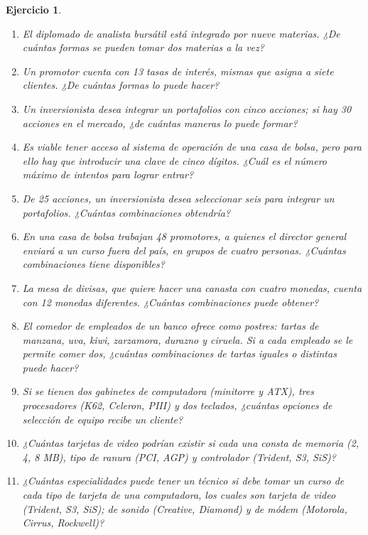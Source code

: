 \documentclass[12pt,twoside]{article}
\newtheorem{Ejer}{Ejercicio}
\begin{document}
\begin{Ejer}
\begin{enumerate}
\item El diplomado de analista bursátil está integrado por nueve materias. ¿De cuántas formas se pueden tomar dos materias a la vez?

\item Un promotor cuenta con 13 tasas de interés, mismas que asigna a siete clientes. ¿De cuántas formas lo puede hacer?

\item Un inversionista desea integrar un portafolios con cinco acciones; si hay 30 acciones en el mercado, ¿de cuántas maneras lo puede formar?

\item Es viable tener acceso al sistema de operación de una casa de bolsa, pero para ello hay que introducir una clave de cinco dígitos. ¿Cuál es el número máximo de intentos para lograr entrar?

\item De 25 acciones, un inversionista desea seleccionar seis para integrar un portafolios. ¿Cuántas combinaciones obtendría?

\item En una casa de bolsa trabajan 48 promotores, a quienes el director general enviará a un curso fuera del país, en grupos de cuatro personas. ¿Cuántas combinaciones tiene disponibles?

\item La mesa de divisas, que quiere hacer una canasta con cuatro monedas, cuenta con 12 monedas diferentes. ¿Cuántas combinaciones puede obtener?

\item El comedor de empleados de un banco ofrece como postres: tartas de manzana, uva, kiwi, zarzamora, durazno y ciruela. Si a cada empleado se le permite comer dos, ¿cuántas combinaciones de tartas iguales o distintas puede hacer?

\item Si se tienen dos gabinetes de computadora (minitorre y ATX), tres procesadores (K62, Celeron, PIII) y dos teclados, ¿cuántas opciones de selección de equipo recibe un cliente?

\item ¿Cuántas tarjetas de video podrían existir si cada una consta de memoria (2, 4, 8 MB), tipo de ranura (PCI, AGP) y controlador (Trident, S3, SiS)?

\item ¿Cuántas especialidades puede tener un técnico si debe tomar un curso de cada tipo de tarjeta de una computadora, los cuales son tarjeta de video (Trident, S3, SiS); de sonido (Creative, Diamond) y de módem (Motorola, Cirrus, Rockwell)?


\end{enumerate}
\end{Ejer}
\end{document}
